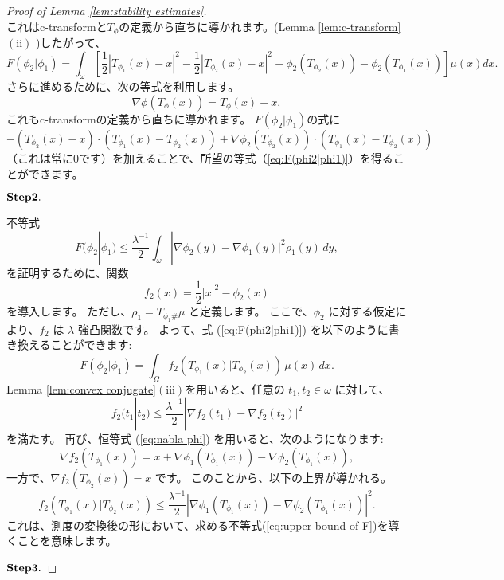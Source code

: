 \documentclass{jsarticle}
\theoremstyle{definition}
\begin{document}
\begin{proof}[Proof of Lemma \ref{lem:stability estimates}]
\[  \]
  これはc-transformと$T_{\phi}$の定義から直ちに導かれます。(Lemma \ref{lem:c-transform} $(\mathrm{ii})$ )したがって、
  \[
    F(\phi_2 | \phi_1) = \int_{\omega} \left[\frac{1}{2} |T_{\phi_1}(x) - x|^2 -\frac{1}{2} |T_{\phi_2}(x) - x|^2 + \phi_2(T_{\phi_2}(x)) - \phi_2 (T_{\phi_1}(x))\right] \mu(x)dx.
  \]
  さらに進めるために、次の等式を利用します。
  \begin{equation}
    \label{eq:nabla phi}
    \nabla \phi(T_\phi(x)) = T_\phi(x) - x,
  \end{equation}
  これもc-transformの定義から直ちに導かれます。
  $F(\phi_2 | \phi_1)$の式に
  \[
    -(T_{\phi_2}(x) - x) \cdot (T_{\phi_1}(x) - T_{\phi_2}(x)) + \nabla \phi_2(T_{\phi_2}(x)) \cdot (T_{\phi_1}(x) - T_{\phi_2}(x))
  \]
  （これは常に0です）を加えることで、所望の等式（\ref{eq:F(phi2|phi1)}）を得ることができます。

  $\bold{Step 2.}$

  不等式 
  \begin{equation}
    \label{eq:upper bound of F}
    F(\phi_2|\phi_1) \leq \frac{\lambda^{-1}}{2} \int_\omega |\nabla \phi_2(y) - \nabla \phi_1(y)|^2 \rho_1(y) \, dy,
  \end{equation}
  を証明するために、関数 
  \[
    f_2(x) = \frac{1}{2}|x|^2 - \phi_2(x)
  \] 
  を導入します。
  ただし、\(\rho_1 = T_{\phi_1\#}\mu\) と定義します。
  ここで、\(\phi_2\) に対する仮定により、\(f_2\) は \(\lambda\)-強凸関数です。
  よって、式 (\ref{eq:F(phi2|phi1)}) を以下のように書き換えることができます:
  \[
    F(\phi_2|\phi_1) = \int_\Omega f_2(T_{\phi_1}(x) | T_{\phi_2}(x))\,\mu(x) \,dx.
  \]
  Lemma \ref{lem:convex conjugate}$(\mathrm{iii})$を用いると、任意の \(t_1, t_2 \in \omega\)  に対して、
  \[
    f_2(t_1|t_2) \leq \frac{\lambda^{-1}}{2}|\nabla f_2(t_1) - \nabla f_2(t_2)|^2
  \]
  を満たす。
  再び、恒等式 (\ref{eq:nabla phi}) を用いると、次のようになります:
  \[
    \nabla f_2(T_{\phi_1}(x)) = x + \nabla\phi_1(T_{\phi_1}(x)) - \nabla\phi_2(T_{\phi_1}(x)),
  \]
  一方で、\(\nabla f_2(T_{\phi_2}(x)) = x\) です。
  このことから、以下の上界が導かれる。
  \[
    f_2(T_{\phi_1}(x) | T_{\phi_2}(x)) \leq \frac{\lambda^{-1}}{2} \left|\nabla\phi_1(T_{\phi_1}(x)) - \nabla\phi_2(T_{\phi_1}(x))\right|^2.
  \]
  これは、測度の変換後の形において、求める不等式(\ref{eq:upper bound of F})を導くことを意味します。

  $\bold{Step 3.}$


\end{proof}
\end{document}
